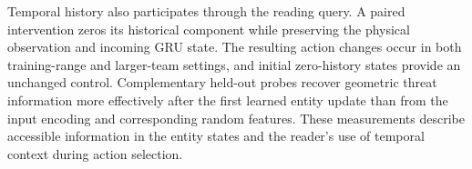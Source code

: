 Temporal history also participates through the reading query. A paired intervention zeros its historical component while preserving the physical observation and incoming GRU state. The resulting action changes occur in both training-range and larger-team settings, and initial zero-history states provide an unchanged control. Complementary held-out probes recover geometric threat information more effectively after the first learned entity update than from the input encoding and corresponding random features. These measurements describe accessible information in the entity states and the reader's use of temporal context during action selection.

